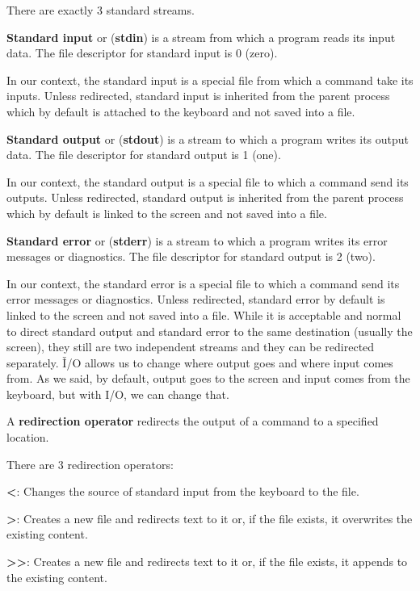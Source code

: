 There are exactly 3 standard streams.

\textbf{Standard input} or (\textbf{stdin}) is a stream from which a program reads its input data. The file descriptor
for standard input is 0 (zero).
\ed

In our context, the standard input is a special file from which a command take its inputs. Unless redirected,
standard input is inherited from the parent process which by default is attached to the keyboard and not saved into a
file.

\textbf{Standard output} or (\textbf{stdout}) is a stream to which a program writes its output data. The file descriptor
for standard output is 1 (one).
\ed

In our context, the standard output is a special file to which a command send its outputs. Unless redirected,
standard output is inherited from the parent process which by default is linked to the screen and not saved into a
file.

\textbf{Standard error} or (\textbf{stderr}) is a stream to which a program writes its error messages or diagnostics.
The file descriptor for standard output is 2 (two).
\ed

In our context, the standard error is a special file to which a command send its error messages or diagnostics.
Unless redirected, standard error by default is linked to the screen and not saved into a file. While it is acceptable
and normal to direct standard output and standard error to the same destination (usually the screen), they still are two
independent streams and they can be redirected separately. \v

I/O allows us to change where output goes and where input comes from. As we said, by default, output goes to the screen
and input comes from the keyboard, but with I/O, we can change that.

A \textbf{redirection operator} redirects the output of a command to a specified location.
\ed

There are 3 redirection operators:
\bit
\item \textbf{<}: Changes the source of standard input from the keyboard to the file.
\item \textbf{>}: Creates a new file and redirects text to it or, if the file exists, it overwrites the existing content.
\item \textbf{>>}: Creates a new file and redirects text to it or, if the file exists, it appends to the existing content.
\eit

